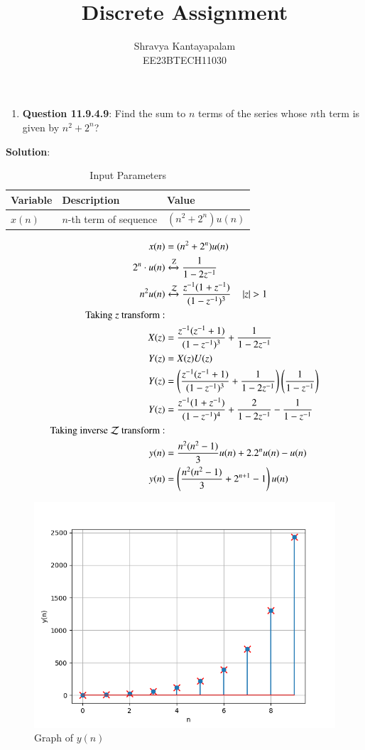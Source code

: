 \documentclass[a4,12pt,onecolumn]{IEEEtran}
\begin{document}
\title{Discrete Assignment}
\author{Shravya Kantayapalam\\ EE23BTECH11030}
\maketitle

\begin{enumerate}
    \item \textbf{Question 11.9.4.9}:
    Find the sum to $n$ terms of the series whose $n$th term is given by $n^2 + 2^n$?
 \end{enumerate}  
    \textbf{Solution}:
   

\begin{table}[htbp]
    \centering
    \caption{Input Parameters}
    \begin{tabular}{|l|l|l|}
    \hline
    \textbf{Variable} & \textbf{Description} & \textbf{Value} \\
    \hline
    \( x(n) \) & \( n \)-th term of sequence & \( (n^2 + 2^n)u(n) \) \\
    \hline
    \end{tabular}
\end{table}
\begin{align}
x(n)&=(n^2+2^n)u(n)\\
2^n \cdot u(n) &\xleftrightarrow{\text{Z}} \frac{1}{1 - 2z^{-1}} \\
n^2u(n) &\xleftrightarrow{\mathcal{Z}} \frac{z^{-1}(1+z^{-1})}{(1-z^{-1})^3} \quad \left\vert z\right\vert>1 \\ 
\text{Taking } z \text{ transform :}\\
X(z)&=\frac{z^{-1}(z^{-1} + 1)}{(1 - z^{-1})^3} +\frac{1}{1 - 2z^{-1}}\\
Y(z)&=X(z)U(z)\\
Y(z)&=\left(\frac{z^{-1}(z^{-1} + 1)}{(1 - z^{-1})^3} +\frac{1}{1 - 2z^{-1}}\right)\left(\frac{1}{1-z^{-1}}\right)\\
Y(z)&=\frac{z^{-1}(1+z^{-1})}{(1-z^{-1})^4}+\frac{2}{1-2z^{-1}}-\frac{1}{1-z^{-1}}\\
\text{Taking inverse } \mathcal{Z} \text{ transform :}\\
y(n)&=\frac{n^2(n^2-1)}{3}u(n)+2.2^nu(n)-u(n)\\
y(n)&=\left(\frac{n^2(n^2-1)}{3}+2^{n+1}-1\right)u(n)
\end{align}
\begin{figure}[ht]
    \centering
    \includegraphics[width=\columnwidth]{figs/main.png}
    \caption{Graph of $y(n)$ }
\end{figure}
\end{document}
